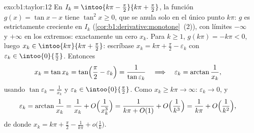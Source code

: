 \begin{solution}{exo:b1:taylor:12}
En $I_k = \intoo{k\pi - \frac\pi2}{k\pi + \frac\pi2}$, la función
$g(x) = \tan x - x$ tiene  $\tan^2 x \geq 0$, que se anula
solo en el único punto $k\pi$: $g$ es estrictamente creciente en
$I_k$ (\cref{cor:b1:derivative:monotone}~(2)), con límites $-\infty$
y $+\infty$ en los extremos: exactamente un cero $x_k$. Para
$k \geq 1$, $g(k\pi) = -k\pi < 0$, luego
$x_k \in \intoo{k\pi}{k\pi + \frac\pi2}$: escríbase
$x_k = k\pi + \frac\pi2 - \varepsilon_k$ con
$\varepsilon_k \in \intoo{0}{\frac\pi2}$. Entonces
\[
x_k = \tan x_k = \tan\Bigl(\frac\pi2 - \varepsilon_k\Bigr)
= \frac{1}{\tan\varepsilon_k}
\quad\Longrightarrow\quad
\varepsilon_k = \arctan\frac{1}{x_k} ,
\]
usando $\tan\varepsilon_k = \frac{1}{x_k}$ y
$\varepsilon_k \in \intoo{0}{\frac\pi2}$. Como
$x_k \geq k\pi \to \infty$: $\varepsilon_k \to 0$, y
\[
\varepsilon_k = \arctan\frac{1}{x_k} = \frac{1}{x_k} +
O\Bigl(\frac{1}{x_k^3}\Bigr)
= \frac{1}{k\pi + O(1)} + O\Bigl(\frac{1}{k^3}\Bigr)
= \frac{1}{k\pi} + O\Bigl(\frac{1}{k^2}\Bigr) ,
\]
de donde $x_k = k\pi + \frac\pi2 - \frac{1}{k\pi} +
o\bigl(\frac1k\bigr)$.
\end{solution}

